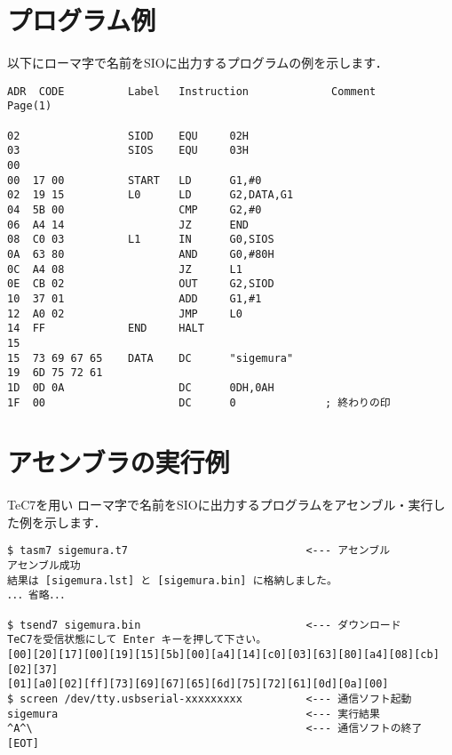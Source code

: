 \newpage
\section{プログラム例}
以下にローマ字で名前をSIOに出力するプログラムの例を示します．

\begin{center}
\begin{verbatim}
ADR  CODE          Label   Instruction             Comment              Page(1)

02                 SIOD    EQU     02H            
03                 SIOS    EQU     03H            
00                 
00  17 00          START   LD      G1,#0          
02  19 15          L0      LD      G2,DATA,G1     
04  5B 00                  CMP     G2,#0          
06  A4 14                  JZ      END            
08  C0 03          L1      IN      G0,SIOS        
0A  63 80                  AND     G0,#80H        
0C  A4 08                  JZ      L1             
0E  CB 02                  OUT     G2,SIOD        
10  37 01                  ADD     G1,#1          
12  A0 02                  JMP     L0             
14  FF             END     HALT                   
15                 
15  73 69 67 65    DATA    DC      "sigemura"     
19  6D 75 72 61 
1D  0D 0A                  DC      0DH,0AH        
1F  00                     DC      0              ; 終わりの印
\end{verbatim}
\end{center}

\section{アセンブラの実行例}
TeC7を用い
ローマ字で名前をSIOに出力するプログラムをアセンブル・実行した例を示します．

\begin{center}
\begin{verbatim}
$ tasm7 sigemura.t7                            <--- アセンブル
アセンブル成功
結果は [sigemura.lst] と [sigemura.bin] に格納しました。
．．．省略．．．

$ tsend7 sigemura.bin                          <--- ダウンロード
TeC7を受信状態にして Enter キーを押して下さい。
[00][20][17][00][19][15][5b][00][a4][14][c0][03][63][80][a4][08][cb][02][37]
[01][a0][02][ff][73][69][67][65][6d][75][72][61][0d][0a][00]
$ screen /dev/tty.usbserial-xxxxxxxxx          <--- 通信ソフト起動
sigemura                                       <--- 実行結果
^A^\                                           <--- 通信ソフトの終了
[EOT]
\end{verbatim}
\end{center}

